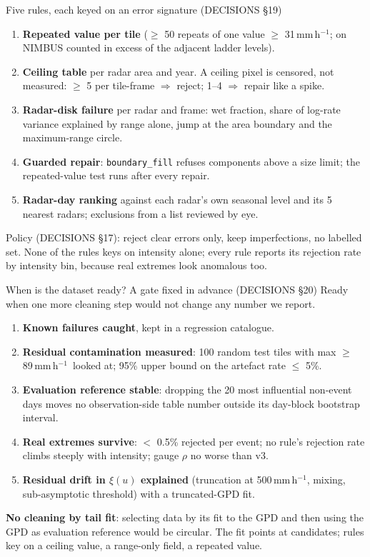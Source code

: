 \documentclass[aspectratio=169,10pt]{beamer}
\newcommand{\mmh}{\,mm\,h$^{-1}$}
\newcommand{\code}[1]{\texttt{\small #1}}
\begin{document}
\begin{frame}{Five rules, each keyed on an error signature (DECISIONS §19)}
  \small
  \begin{enumerate}
    \item \textbf{Repeated value per tile} ($\ge$ 50 repeats of one value $\ge$ 31\mmh; on
      NIMBUS counted in excess of the adjacent ladder levels).
    \item \textbf{Ceiling table} per radar area and year. A ceiling pixel is censored, not
      measured: $\ge$ 5 per tile-frame $\Rightarrow$ reject; 1--4 $\Rightarrow$ repair like a
      spike.
    \item \textbf{Radar-disk failure} per radar and frame: wet fraction, share of log-rate
      variance explained by range alone, jump at the area boundary and the maximum-range
      circle.
    \item \textbf{Guarded repair}: \code{boundary\_fill} refuses components above a size
      limit; the repeated-value test runs after every repair.
    \item \textbf{Radar-day ranking} against each radar's own seasonal level and its 5 nearest
      radars; exclusions from a list reviewed by eye.
  \end{enumerate}
  \vspace{1mm}
  Policy (DECISIONS §17): reject clear errors only, keep imperfections, no labelled set.
  None of the rules keys on intensity alone; every rule reports its rejection rate by
  intensity bin, because real extremes look anomalous too.
\end{frame}

\begin{frame}{When is the dataset ready? A gate fixed in advance (DECISIONS §20)}
  \small
  Ready when one more cleaning step would not change any number we report.
  \begin{enumerate}
    \item \textbf{Known failures caught}, kept in a regression catalogue.
    \item \textbf{Residual contamination measured}: 100 random test tiles with max $\ge$
      89\mmh\ looked at; 95\% upper bound on the artefact rate $\le$ 5\%.
    \item \textbf{Evaluation reference stable}: dropping the 20 most influential non-event days
      moves no observation-side table number outside its day-block bootstrap interval.
    \item \textbf{Real extremes survive}: $<$ 0.5\% rejected per event; no rule's rejection
      rate climbs steeply with intensity; gauge $\rho$ no worse than v3.
    \item \textbf{Residual drift in $\xi(u)$ explained} (truncation at 500\mmh, mixing,
      sub-asymptotic threshold) with a truncated-GPD fit.
  \end{enumerate}
  \vspace{1mm}
  \textbf{No cleaning by tail fit}: selecting data by its fit to the GPD and then using the
  GPD as evaluation reference would be circular. The fit points at candidates; rules key on a
  ceiling value, a range-only field, a repeated value.
\end{frame}
\end{document}
